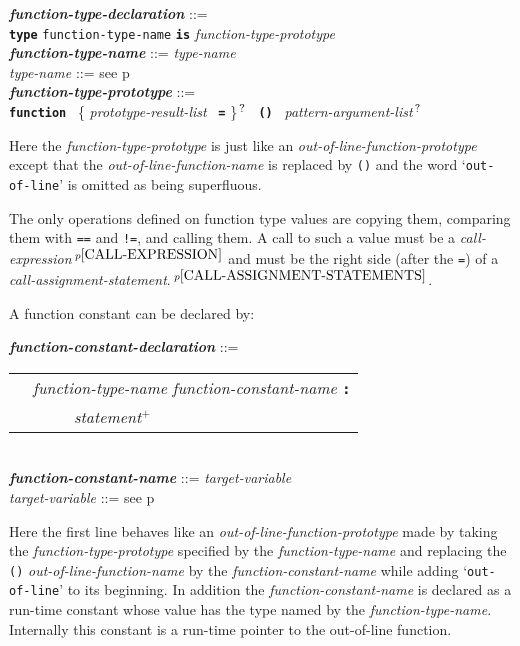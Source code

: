 \documentclass[12pt]{article}
\newcommand{\TT}[1]{{\tt \bfseries #1}}
\newcommand{\PLUS}[1][]{{$^{+#1}$}}
\newcommand{\QMARK}{{$^{\,\mbox{\footnotesize ?}}$}}
\newcommand{\ttkey}[1]{{\tt \bfseries #1}}
\newcommand{\emkey}[1]{{\em \bfseries #1}}
\newcommand{\pagref}[1]{p\pageref{#1}}
\newcommand{\pagnote}[1]{$\,^{p\pageref{#1}}$}
\newenvironment{indpar}[1][0.3in]%
	{\begin{list}{}%
		     {\setlength{\itemsep}{0in}%
		      \setlength{\topsep}{0in}%
		      \setlength{\parsep}{1ex}%
		      \setlength{\labelwidth}{#1}%
		      \setlength{\leftmargin}{#1}%
		      \addtolength{\leftmargin}{\labelsep}}%
	 \item}%
	{\end{list}}
\begin{document}
\begin{indpar}
\emkey{function-type-declaration}\label{FUNCTION-TYPE-DECLARATION} ::= \\
\hspace*{0.5in}
    \ttkey{type} {\tt function-type-name} \TT{is}
                 {\em function-type-prototype}
\\[0.5ex]
\emkey{function-type-name} ::= {\em type-name}
\\[0.5ex]
{\em type-name} ::= see \pagref{TYPE-NAME}
\\[0.5ex]
\emkey{function-type-prototype}%
	\label{FUNCTION-TYPE-PROTOTYPE} ::= \\
\hspace*{0.25in} \ttkey{function}~
        \{ {\em prototype-result-list}~ \TT{=} \}\QMARK{}~
	\TT{()}~ {\em pattern-argument-list}\QMARK{}
\end{indpar}

Here the {\em function-type-prototype} is just like an
{\em out-of-line-function-prototype} except that the
{\em out-of-line-function-name} is replaced by {\tt ()} and
the word `{\tt out-of-line}' is omitted as being superfluous.

The only operations defined on function type values are copying them,
comparing them with {\tt ==} and {\tt !=}, and
calling them.  A call to such a value must be a
{\em call-expression}\pagnote{CALL-EXPRESSION} and
must be the right side (after the {\tt =})
of a {\em call-assignment-state\-ment}.\pagnote{CALL-ASSIGNMENT-STATEMENTS}.

A function constant can be declared by:
\begin{indpar}
\emkey{function-constant-declaration}%
    \label{FUNCTION-CONSTANT-DECLARATION} ::= \\
\hspace*{0.5in}
    \begin{tabular}[t]{rl}
        &  {\em function-type-name} {\em function-constant-name} \TT{:} \\
	& \TT{~~~~~}{\em statement}\PLUS{} \\
    \end{tabular}
\\[0.5ex]
\emkey{function-constant-name} ::= {\em target-variable}
\\[0.5ex]
{\em target-variable} ::= see \pagref{TARGET-VARIABLE}
\end{indpar}

Here the first line behaves like an {\em out-of-line-function-prototype}
made by taking the {\em function-type-prototype} specified by the
{\em function-type-name} and replacing the {\tt ()}
{\em out-of-line-function-name} by the {\em function-constant-name}
while adding `{\tt out-of-line}' to its beginning.  In addition
the {\em function-constant-name} is declared as a run-time constant whose
value has the type named by the {\em function-type-name}.
Internally this constant is a run-time pointer to the out-of-line function.
\end{document}
